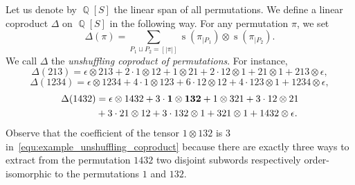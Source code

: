 \documentclass[a4paper]{llncs}
\DeclareMathOperator{\QQ}{\mathbb{Q}}
\DeclareMathOperator{\STD}{\mathrm{s}}
\begin{document}
Let us denote by $\QQ[S]$ the linear span of all permutations. We
define a linear coproduct $\Delta$ on $\QQ[S]$ in the following way. For
any permutation $\pi$, we set
\begin{equation} \label{equ:unshuffling_coproduct}
    \Delta(\pi) =
    \sum_{P_1 \sqcup P_2 = [|\pi|]}
    \STD\left(\pi_{|P_1}\right) \otimes \STD\left(\pi_{|P_2}\right).
\end{equation}
We call $\Delta$ the {\em unshuffling coproduct of permutations}. For
instance,
\begin{equation}
    \Delta(213) =
    \epsilon \otimes 213 + 2 \cdot 1 \otimes 12 +
    1 \otimes 21 + 2 \cdot 12 \otimes 1 + 21 \otimes 1 
    + 213 \otimes \epsilon,
\end{equation}
\begin{equation}
    \Delta(1234) =
    \epsilon \otimes 1234 + 4 \cdot 1 \otimes 123 + 6 \cdot 12 \otimes 12 +
    4 \cdot 123 \otimes 1 + 1234 \otimes \epsilon,
\end{equation}
\begin{equation}\begin{split} \label{equ:example_unshuffling_coproduct}
    \Delta(1432) & =
    \epsilon \otimes 1432 + 3 \cdot {\bf 1 \otimes 132} + 1 \otimes 321 +
    3 \cdot 12 \otimes 21 \\ & + 3 \cdot 21 \otimes 12 
    + 3 \cdot 132 \otimes 1 + 321 \otimes 1 + 1432 \otimes \epsilon.
\end{split}\end{equation}
Observe that the coefficient of the tensor $1 \otimes 132$ is $3$
in~\eqref{equ:example_unshuffling_coproduct} because there are exactly
three ways to extract from the permutation $1432$ two disjoint subwords
respectively order-isomorphic to the permutations $1$ and $132$.
\end{document}
